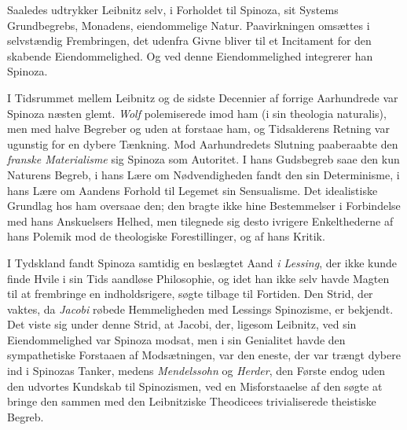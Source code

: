\documentclass[12pt,a4paper]{book}
\newcommand{\opage}[1]{\marginnote{\footnotesize\textit{[#1]}}}
\begin{document}
\opage{186} Saaledes udtrykker Leibnitz selv, i Forholdet til Spinoza,
sit Systems Grundbegrebs, Monadens, eiendommelige Natur.
Paavirkningen omsættes i selvstændig Frembringen, det udenfra
Givne bliver til et Incitament for den skabende Eiendommelighed.
Og ved denne Eiendommelighed integrerer
han Spinoza.

I Tidsrummet mellem Leibnitz og de sidste Decennier
af forrige Aarhundrede var Spinoza næsten glemt. \emph{Wolf}
polemiserede imod ham (i sin theologia naturalis), men med
halve Begreber og uden at forstaae ham, og Tidsalderens
Retning var ugunstig for en dybere Tænkning. Mod Aarhundredets
Slutning paaberaabte den \emph{franske Materialisme}
sig Spinoza som Autoritet. I hans Gudsbegreb saae
den kun Naturens Begreb, i hans Lære om Nødvendigheden
fandt den sin Determinisme, i hans Lære om Aandens Forhold
til Legemet sin Sensualisme. Det idealistiske Grundlag
hos ham oversaae den; den bragte ikke hine Bestemmelser
i Forbindelse med hans Anskuelsers Helhed, men tilegnede
sig desto ivrigere Enkelthederne af hans Polemik
mod de theologiske Forestillinger, og af hans Kritik.

I Tydskland fandt Spinoza samtidig en beslægtet Aand
\emph{i Lessing}, der ikke kunde finde Hvile i sin Tids aandløse
Philosophie, og idet han ikke selv havde Magten til at frembringe
en indholdsrigere, søgte tilbage til Fortiden. Den
Strid, der vaktes, da \emph{Jacobi} røbede Hemmeligheden med
Lessings Spinozisme, er bekjendt. Det viste sig under denne
Strid, at Jacobi, der, ligesom Leibnitz, ved sin Eiendommelighed
var Spinoza modsat, men i sin Genialitet havde den
sympathetiske Forstaaen af Modsætningen, var den eneste,
der var trængt dybere ind i Spinozas Tanker, medens \emph{Mendelssohn}
og \emph{Herder}, den Første endog uden den udvortes
Kundskab til Spinozismen, ved en Misforstaaelse af
den søgte at bringe den sammen med den Leibnitziske Theodicees
trivialiserede theistiske Begreb.
\end{document}
